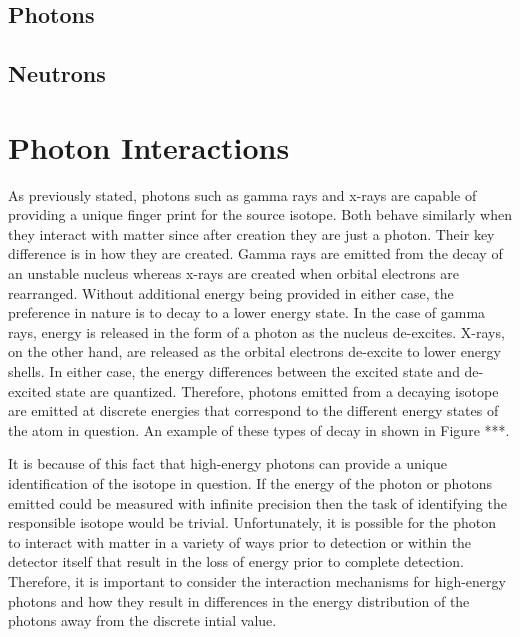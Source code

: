 \subsection{Photons}
\subsection{Neutrons}

\section{Photon Interactions}
As previously stated, photons such as gamma rays and x-rays are capable of providing a unique finger print for the source isotope.  Both behave similarly when they interact with matter since after creation they are just a photon.  Their key difference is in how they are created.  Gamma rays are emitted from the decay of an unstable nucleus whereas x-rays are created when orbital electrons are rearranged.  Without additional energy being provided in either case, the preference in nature is to decay to a lower energy state.  In the case of gamma rays, energy is released in the form of a photon as the nucleus de-excites.  X-rays, on the other hand, are released as the orbital electrons de-excite to lower energy shells.  In either case, the energy differences between the excited state and de-excited state are quantized.    Therefore, photons emitted from a decaying isotope are emitted at discrete energies that correspond to the different energy states of the atom in question.  An example of these types of decay in shown in Figure ***.  


It is because of this fact that high-energy photons can provide a unique identification of the isotope in question.  If the energy of the photon or photons emitted could be measured with infinite precision then the task of identifying the responsible isotope would be trivial.  Unfortunately, it is possible for the photon to interact with matter in a variety of ways prior to detection or within the detector itself that result in the loss of energy prior to complete detection.  Therefore, it is important to consider the interaction mechanisms for high-energy photons and how they result in differences in the energy distribution of the photons away from the discrete intial value.

